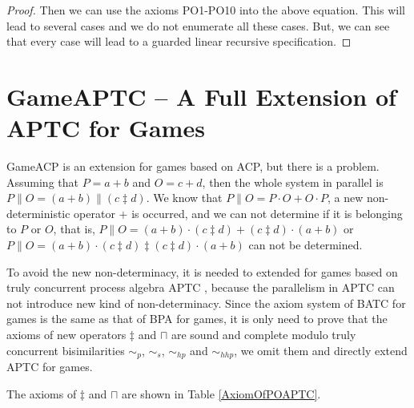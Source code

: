 \documentclass{fac}
\begin{document}
\begin{proof}
Then we can use the axioms PO1-PO10 into the above equation. This will lead to several cases and we do not enumerate all these cases. But, we can see that every case will lead to a guarded linear recursive specification.
\end{proof}

\section{GameAPTC -- A Full Extension of APTC for Games}

GameACP is an extension for games based on ACP, but there is a problem. Assuming that $P=a+b$ and $O=c+d$, then the whole system in parallel is $P\parallel O=(a+b)\parallel (c\ddagger d)$. We know that $P\parallel O=P\cdot O + O\cdot P$, a new non-deterministic operator $+$ is occurred, and we can not determine if it is belonging to $P$ or $O$, that is, $P\parallel O=(a+b)\cdot(c\ddagger d)+(c\ddagger d)\cdot(a+b)$ or $P\parallel O=(a+b)\cdot(c\ddagger d)\ddagger(c\ddagger d)\cdot(a+b)$ can not be determined.

To avoid the new non-determinacy, it is needed to extended for games based on truly concurrent process algebra APTC \cite{APTC}, because the parallelism in APTC can not introduce new kind of non-determinacy. Since the axiom system of BATC for games is the same as that of BPA for games, it is only need to prove that the axioms of new operators $\ddagger$ and $\sqcap$ are sound and complete modulo truly concurrent bisimilarities $\sim_p$, $\sim_s$, $\sim_{hp}$ and $\sim_{hhp}$, we omit them and directly extend APTC for games.

The axioms of $\ddagger$ and $\sqcap$ are shown in Table \ref{AxiomOfPOAPTC}.
\end{document}
